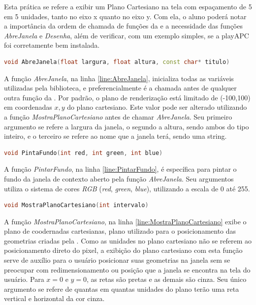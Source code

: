 Esta prática se refere a exibir um Plano Cartesiano na tela com espaçamento de 5 em 5 unidades, tanto no eixo x quanto no eixo y. Com ela, o aluno poderá notar a importância da ordem de chamada de funções da \playAPC{} e a necessidade das funções \emph{AbreJanela} e \emph{Desenha}, além de verificar, com um exemplo simples, se a playAPC{} foi corretamente bem instalada.



\begin{lstlisting}[label={func:AbreJanela},language=C++]
void AbreJanela(float largura, float altura, const char* titulo)
\end{lstlisting}

A função \emph{AbreJanela}, na linha \ref{line:AbreJanela}, inicializa todas as variáveis utilizadas pela biblioteca, e preferencialmente é a chamada antes de qualquer outra função da \playAPC{}. Por padrão, o plano de renderização está limitado de (-100,100) em coordenadas $x,y$ do plano cartesiano. Este valor pode ser alterado utilizando a função \emph{MostraPlanoCartesiano} antes de chamar \emph{AbreJanela}.
Seu primeiro argumento se refere a largura da janela, o segundo a altura, sendo ambos do tipo inteiro, e o terceiro se refere ao nome que a janela terá, sendo uma string.


\begin{lstlisting}[label={func:PintarFundo},language=C++]
void PintaFundo(int red, int green, int blue)
\end{lstlisting}
A função \emph{PintarFundo}, na linha \ref{line:PintarFundo}, é específica para pintar o fundo da janela de contexto aberto pela função \emph{AbreJanela}. Seu argumentos utiliza o sistema de cores \emph{RGB} (\emph{red}, \emph{green}, \emph{blue}), utilizando a escala de 0 até 255.

\begin{lstlisting}[label={func:MostraPlanoCartesiano},language=C++]
void MostraPlanoCartesiano(int intervalo)
\end{lstlisting}
A função \emph{MostraPlanoCartesiano}, na linha \ref{line:MostraPlanoCartesiano} exibe o plano de coodernadas cartesianas, plano utilizado para o posicionamento das geometrias criadas pela \playAPC{}. Como as unidades no plano cartesiano não se referem ao posicionamento direto do pixel, a exibição do plano cartesiano com esta função serve de auxílio para o usuário posicionar suas geometrias na janela sem se preocupar com redimensionamento ou posição que a janela se encontra na tela do usuário. Para $x = 0$ e $y = 0$, as retas são pretas e as demais são cinza.
Seu único argumento se refere de quantas em quantas unidades do plano terão uma reta vertical e horizontal da cor cinza.

